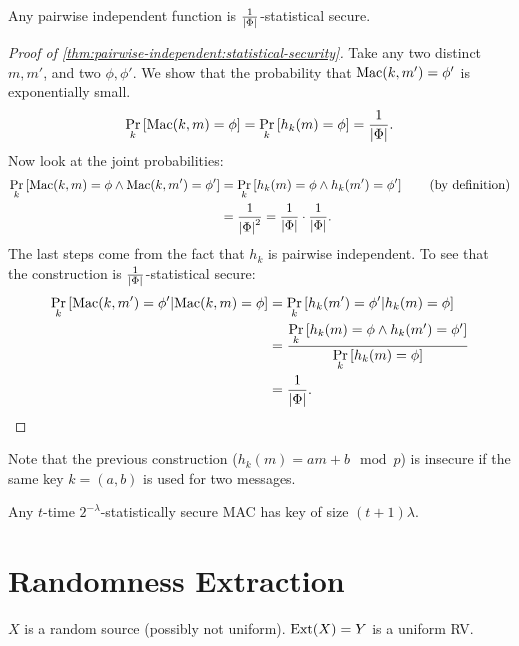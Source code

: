\begin{theorem} \label{thm:pairwise-independent:statistical-security}
	Any pairwise independent function is $\frac{1}{\abs{\GenericAuthSpace}}$-statistical secure.
\end{theorem}

\begin{proof}[Proof of \cref{thm:pairwise-independent:statistical-security}]
	Take any two distinct $m, m'$, and two $\phi, \phi'$.
	We show that the probability that $\GenericMac(k,m') = \phi'$ is exponentially small.
	\begin{equation*}
		\Pr[k]{\GenericMac(k,m) = \phi} =
		\Pr[k]{h_k(m) = \phi} =
		\frac{1}{\abs{\GenericAuthSpace}}.
	\end{equation*}
	Now look at the joint probabilities:
	\begin{align*}
		\Pr[k]{\GenericMac(k,m) = \phi \land \GenericMac(k,m') = \phi'} 
		& = 
		\Pr[k]{h_k(m) = \phi \land h_k(m') = \phi'} 
		\tag{by definition}
		\\
		& =
		\frac{1}{\abs{\GenericAuthSpace}^2}
		=
		\frac{1}{\abs{\GenericAuthSpace}}
		\cdot
		\frac{1}{\abs{\GenericAuthSpace}}.
	\end{align*}
	The last steps come from the fact that $h_k$ is pairwise independent.
	To see that the construction is $\frac{1}{\abs{\GenericAuthSpace}}$-statistical secure:
	\begin{align*}
		\Pr[k]{\GenericMac(k, m') = \phi' | \GenericMac(k,m) = \phi}
		& =
		\Pr[k]{h_k(m') = \phi' | h_k(m) = \phi}
		\\
		& =
		\frac{\Pr[k]{h_k(m) = \phi \land h_k(m') = \phi'}}{\Pr[k]{h_k(m) = \phi}}
		\\
		& =
		\frac{1}{\abs{\GenericAuthSpace}}.
	\end{align*}
\end{proof}

Note that the previous construction ($h_k(m) = a m + b \mod p$) is insecure if the same key $k = (a,b)$ is used for two messages.

\begin{theorem}
	Any $t$-time $2^{-\lambda}$-statistically secure \ac{MAC} has key of size $(t+1)\lambda$.
\end{theorem}

\section{Randomness Extraction}

$X$ is a random source (possibly not uniform).
$\Ext(X) = Y$ is a uniform \ac{RV}.

